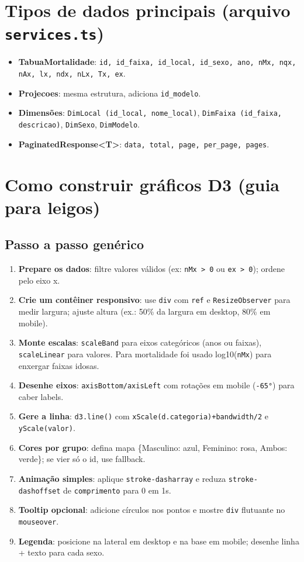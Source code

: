 \documentclass[12pt,a4paper]{article}
\begin{document}
\section{Tipos de dados principais (arquivo \texttt{services.ts})}
\begin{itemize}[leftmargin=*]
  \item \textbf{TabuaMortalidade}: \texttt{id, id\_faixa, id\_local, id\_sexo, ano, nMx, nqx, nAx, lx, ndx, nLx, Tx, ex}.
  \item \textbf{Projecoes}: mesma estrutura, adiciona \texttt{id\_modelo}.
  \item \textbf{Dimensões}: \texttt{DimLocal (id\_local, nome\_local)}, \texttt{DimFaixa (id\_faixa, descricao)}, \texttt{DimSexo}, \texttt{DimModelo}.
  \item \textbf{PaginatedResponse<T>}: \texttt{data, total, page, per\_page, pages}.
\end{itemize}

\section{Como construir gráficos D3 (guia para leigos)}
\subsection*{Passo a passo genérico}
\begin{enumerate}[leftmargin=*]
  \item \textbf{Prepare os dados}: filtre valores válidos (ex: \texttt{nMx > 0} ou \texttt{ex > 0}); ordene pelo eixo x.
  \item \textbf{Crie um contêiner responsivo}: use \texttt{div} com \texttt{ref} e \texttt{ResizeObserver} para medir largura; ajuste altura (ex.: 50\% da largura em desktop, 80\% em mobile).
  \item \textbf{Monte escalas}: \texttt{scaleBand} para eixos categóricos (anos ou faixas), \texttt{scaleLinear} para valores. Para mortalidade foi usado log10(\texttt{nMx}) para enxergar faixas idosas.
  \item \textbf{Desenhe eixos}: \texttt{axisBottom/axisLeft} com rotações em mobile (\texttt{-65°}) para caber labels.
  \item \textbf{Gere a linha}: \texttt{d3.line()} com \texttt{xScale(d.categoria)+bandwidth/2} e \texttt{yScale(valor)}.
  \item \textbf{Cores por grupo}: defina mapa \{Masculino: azul, Feminino: rosa, Ambos: verde\}; se vier só o id, use fallback.
  \item \textbf{Animação simples}: aplique \texttt{stroke-dasharray} e reduza \texttt{stroke-dashoffset} de \texttt{comprimento} para 0 em 1s.
  \item \textbf{Tooltip opcional}: adicione círculos nos pontos e mostre \texttt{div} flutuante no \texttt{mouseover}.
  \item \textbf{Legenda}: posicione na lateral em desktop e na base em mobile; desenhe linha + texto para cada sexo.
\end{enumerate}
\end{document}

